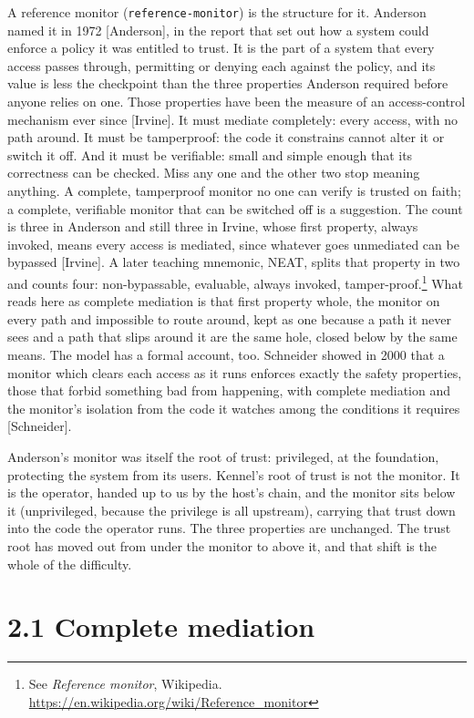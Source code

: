 A reference monitor (\texttt{reference-monitor}) is the structure for
it. Anderson named it in 1972 {[}Anderson{]}, in the report that set out
how a system could enforce a policy it was entitled to trust. It is the
part of a system that every access passes through, permitting or denying
each against the policy, and its value is less the checkpoint than the
three properties Anderson required before anyone relies on one. Those
properties have been the measure of an access-control mechanism ever
since {[}Irvine{]}. It must mediate completely: every access, with no
path around. It must be tamperproof: the code it constrains cannot alter
it or switch it off. And it must be verifiable: small and simple enough
that its correctness can be checked. Miss any one and the other two stop
meaning anything. A complete, tamperproof monitor no one can verify is
trusted on faith; a complete, verifiable monitor that can be switched
off is a suggestion. The count is three in Anderson and still three in
Irvine, whose first property, always invoked, means every access is
mediated, since whatever goes unmediated can be bypassed {[}Irvine{]}. A
later teaching mnemonic, NEAT, splits that property in two and counts
four: non-bypassable, evaluable, always invoked,
tamper-proof.\footnote{See \emph{Reference monitor}, Wikipedia.
  \url{https://en.wikipedia.org/wiki/Reference_monitor}} What reads here
as complete mediation is that first property whole, the monitor on every
path and impossible to route around, kept as one because a path it never
sees and a path that slips around it are the same hole, closed below by
the same means. The model has a formal account, too. Schneider showed in
2000 that a monitor which clears each access as it runs enforces exactly
the safety properties, those that forbid something bad from happening,
with complete mediation and the monitor's isolation from the code it
watches among the conditions it requires {[}Schneider{]}.

Anderson's monitor was itself the root of trust: privileged, at the
foundation, protecting the system from its users. Kennel's root of trust
is not the monitor. It is the operator, handed up to us by the host's
chain, and the monitor sits below it (unprivileged, because the
privilege is all upstream), carrying that trust down into the code the
operator runs. The three properties are unchanged. The trust root has
moved out from under the monitor to above it, and that shift is the
whole of the difficulty.

\hypertarget{complete-mediation}{%
\section{2.1 Complete mediation}\label{complete-mediation}}

